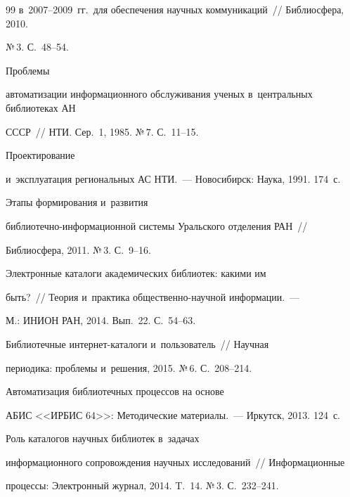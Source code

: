 {{\begin{thebibliography}{99}
в~2007--2009~гг.\ для обеспечения научных коммуникаций~/\!\!/ Библиосфера, 2010. 


№\,3. С.~48--54.




 Проблемы 


автоматизации информационного обслуживания ученых в~центральных библиотеках АН 


СССР~/\!\!/ НТИ. Сер.~1, 1985. №\,7. С.~11--15. 




 Проектирование 


и~эксплуатация региональных АС НТИ.~--- Новосибирск: Наука, 1991. 174~с.




 Этапы формирования и~развития  


биб\-лио\-теч\-но-ин\-фор\-ма\-ци\-он\-ной системы Уральского отделения РАН~/\!\!/ 


Библиосфера, 2011. №\,3. С.~9--16.




 Электронные каталоги академических библиотек: какими им 


быть?~/\!\!/ Теория и~практика об\-щест\-вен\-но-на\-уч\-ной информации.~--- 


М.: ИНИОН РАН, 2014. Вып.~22. С.~54--63.




 Библиотечные интернет-ка\-та\-ло\-ги и~пользователь~/\!\!/ Научная 


периодика: проблемы и~решения, 2015. №\,6. С.~208--214. 




 Автоматизация библиотечных процессов на основе 


АБИС <<ИРБИС 64>>: Методические материалы.~--- Иркутск, 2013. 124~с.




 Роль каталогов научных библиотек в~задачах 


информационного сопровождения научных исследований~/\!\!/ Информационные 


процессы: Электронный журнал, 2014. T.~14. №\,3. С.~232--241.



\end{thebibliography}}}
